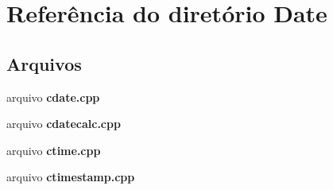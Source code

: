 \section{Referência do diretório Date}
\label{dir_87f9566c04acd70d876b2faba89ea6fd}
\subsection*{Arquivos}
\begin{DoxyCompactItemize}
\item 
arquivo {\bf cdate.\+cpp}
\item 
arquivo {\bf cdatecalc.\+cpp}
\item 
arquivo {\bf ctime.\+cpp}
\item 
arquivo {\bf ctimestamp.\+cpp}
\end{DoxyCompactItemize}
